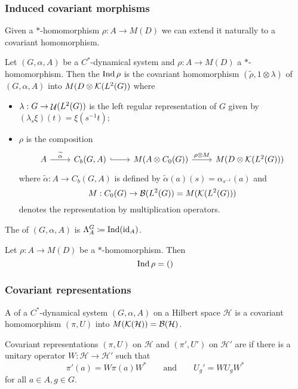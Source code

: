 \subsubsection{Induced covariant morphisms}
Given a $*$-homomorphism $\rho: A\to M(D)$ we can extend it naturally to a covariant homomorphism.
\begin{definition}
Let $(G, \alpha, A)$ be a $C^*$-dynamical system and $\rho: A\to M(D)$ a $*$-homomorphism. Then the  $\operatorname{Ind} \rho$ is the covariant homomorphism $(\widetilde{\rho}, 1\otimes \lambda)$ of $(G, \alpha, A)$ into $M(D\otimes\operatorname{\mathcal{K}}(L^2(G))$ where
\begin{itemize}
\item $\lambda: G\to \mathop{\mathcal{U}}\nolimits(L^2(G))$ is the left regular representation of $G$ given by $(\lambda_s\xi)(t) =\xi(s^{-1}t)$;
\item $\rho$ is the composition
\[ \begin{tikzcd}
A \rar{\widetilde{\alpha}} & C_b(G,A) \ar[r,hook] & M(A\otimes C_0(G)) \rar{\rho\otimes M} & M(D\otimes \Compact(L^2(G)))
\end{tikzcd} \]
where $\widetilde{\alpha}: A\to C_b(G,A)$ is defined by $\widetilde{\alpha}(a)(s)= \alpha_{s^{-1}}(a)$ and 
\[ M: C_0(G)\to \operatorname{\mathcal{B}}(L^2(G)) = M(\operatorname{\mathcal{K}}(L^2(G))) \]
denotes the representation by multiplication operators.
\end{itemize}
\end{definition}
The  of $(G, \alpha, A)$ is $\Lambda^G_A \coloneqq \operatorname{Ind}(\operatorname{id}_A)$.

\begin{lemma}
Let $\rho: A\to M(D)$ be a $*$-homomorphism. Then
\[ \operatorname{Ind}\rho = () \]
\end{lemma}

\subsubsection{Covariant representations}
\begin{definition}
A  of a $C^*$-dynamical system $(G,\alpha, A)$ on a Hilbert space $\mathcal{H}$ is a covariant homomorphism $(\pi, U)$ into $M(\operatorname{\mathcal{K}}(\mathcal{H})) = \operatorname{\mathcal{B}}(\mathcal{H})$.
\end{definition}

\begin{definition}
Covariant representations $(\pi, U)$ on $\mathcal{H}$ and $(\pi', U')$ on $\mathcal{H}'$ are  if there is a unitary operator $W: \mathcal{H}\to \mathcal{H}'$ such that
\[ \pi'(a) = W\pi(a)W^* \qquad \text{and} \qquad U_g' =  WU_gW^* \]
for all $a\in A,g\in G$.
\end{definition}

